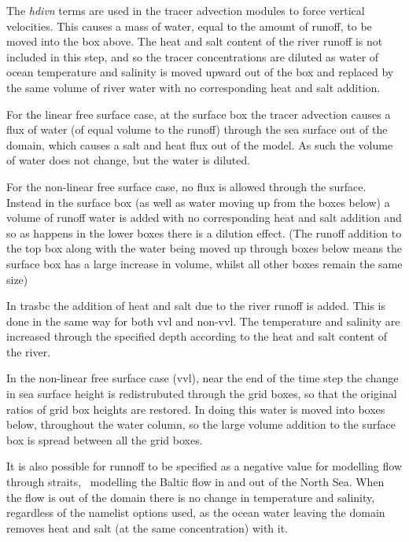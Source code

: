 \documentclass[../main/NEMO_manual]{subfiles}
\begin{document}
The \textit{hdivn} terms are used in the tracer advection modules to force vertical velocities.
This causes a mass of water, equal to the amount of runoff, to be moved into the box above.
The heat and salt content of the river runoff is not included in this step,
and so the tracer concentrations are diluted as water of ocean temperature and salinity is moved upward out of
the box and replaced by the same volume of river water with no corresponding heat and salt addition.

For the linear free surface case, at the surface box the tracer advection causes a flux of water
(of equal volume to the runoff) through the sea surface out of the domain,
which causes a salt and heat flux out of the model.
As such the volume of water does not change, but the water is diluted.

For the non-linear free surface case, no flux is allowed through the surface.
Instead in the surface box (as well as water moving up from the boxes below) a volume of runoff water is added with
no corresponding heat and salt addition and so as happens in the lower boxes there is a dilution effect.
(The runoff addition to the top box along with the water being moved up through
boxes below means the surface box has a large increase in volume, whilst all other boxes remain the same size)

In trasbc the addition of heat and salt due to the river runoff is added.
This is done in the same way for both vvl and non-vvl.
The temperature and salinity are increased through the specified depth according to
the heat and salt content of the river.

In the non-linear free surface case (vvl),
near the end of the time step the change in sea surface height is redistrubuted through the grid boxes,
so that the original ratios of grid box heights are restored.
In doing this water is moved into boxes below, throughout the water column,
so the large volume addition to the surface box is spread between all the grid boxes.

It is also possible for runnoff to be specified as a negative value for modelling flow through straits,
\ie\ modelling the Baltic flow in and out of the North Sea.
When the flow is out of the domain there is no change in temperature and salinity,
regardless of the namelist options used,
as the ocean water leaving the domain removes heat and salt (at the same concentration) with it.

\end{document}
